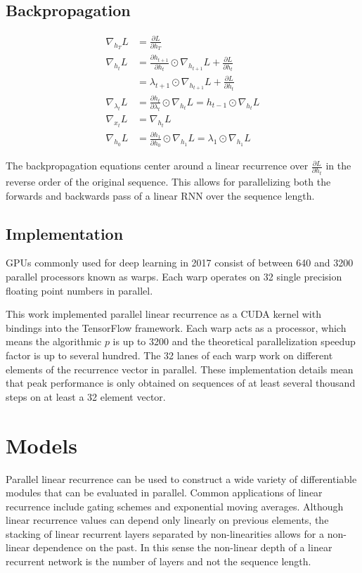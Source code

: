 \documentclass{article}
\begin{document}
\subsection{Backpropagation}
\begin{align*}
\nabla_{h_T}L &= \frac{\partial L}{\partial h_T} \\
\nabla_{h_t}L &= \frac{\partial h_{t+1}}{\partial h_t} \odot \nabla_{h_{t+1}} L + \frac{\partial L}{\partial h_t} \\
&= \lambda_{t+1} \odot \nabla_{h_{t+1}} L + \frac{\partial L}{\partial h_t} \\
\nabla_{\lambda_t}L &= \frac{\partial h_t}{\partial\lambda_t} \odot \nabla_{h_t}L = h_{t-1} \odot \nabla_{h_t}L \\
\nabla_{x_t}L &= \nabla_{h_t} L \\
\nabla_{h_0}L &=  \frac{\partial h_1}{\partial h_0} \odot \nabla_{h_1} L = \lambda_1 \odot \nabla_{h_1} L
\end{align*}

The backpropagation equations center around a linear recurrence over $\frac{\partial L}{\partial h_t}$ in the reverse order of the original sequence. This allows for parallelizing both the forwards and backwards pass of a linear RNN over the sequence length.

\subsection{Implementation}
GPUs commonly used for deep learning in 2017 consist of between 640 and 3200 parallel
processors known as warps. Each warp operates on 32 single precision floating
point numbers in parallel.

This work implemented parallel linear recurrence as a CUDA kernel with bindings
into the TensorFlow \cite{abadi2016tensorflow} framework. Each warp acts as a
processor, which means the algorithmic $p$ is up to 3200 and the theoretical
parallelization speedup factor is up to several hundred.  The 32 lanes of each
warp work on different elements of the recurrence vector in parallel. These
implementation details mean that peak performance is only obtained on sequences
of at least several thousand steps on at least a 32 element vector.

\section{Models}
Parallel linear recurrence can be used to construct a wide variety of differentiable modules that can be evaluated in parallel. Common applications of linear recurrence include gating schemes and exponential moving averages. Although linear recurrence values can depend only linearly on previous elements, the stacking of linear recurrent layers separated by non-linearities allows for a non-linear dependence on the past. In this sense the non-linear depth of a linear recurrent network is the number of layers and not the sequence length.
\end{document}
